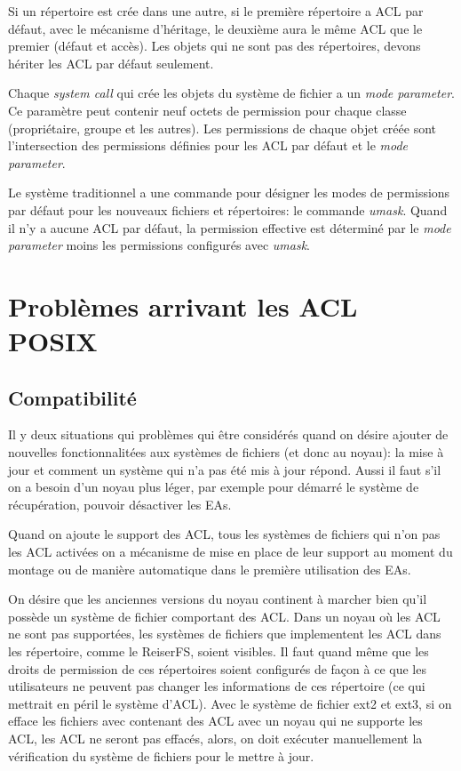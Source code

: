 \documentclass{article}
\begin{document}
Si un répertoire est crée dans une autre, si le première répertoire a ACL par défaut, avec le mécanisme d'héritage, le deuxième aura le même ACL que le premier (défaut  et accès). Les objets qui ne sont pas des répertoires, devons hériter les ACL par défaut seulement.
 
Chaque \emph{system call} qui crée les objets du système de fichier a un \emph{mode parameter}. Ce paramètre peut contenir neuf octets de permission pour chaque classe (propriétaire, groupe et les autres). Les permissions de chaque objet créée sont l'intersection des permissions définies pour les ACL par défaut et le \emph{mode parameter}.
 
Le système traditionnel a une commande pour désigner les modes de permissions par défaut pour les nouveaux fichiers et répertoires: le commande \emph{umask}. Quand il n'y a aucune ACL par défaut, la permission effective est déterminé par le \emph{mode parameter} moins les permissions configurés avec \emph{umask}.

\section{Problèmes arrivant les ACL POSIX}

\subsection{Compatibilité}

Il y deux situations qui problèmes qui être considérés quand on désire ajouter de nouvelles fonctionnalitées aux systèmes de fichiers (et donc au noyau): la mise à jour et comment un système qui n'a pas été mis à jour répond.
Aussi il faut s'il on a besoin d'un noyau plus léger, par exemple pour démarré le système de récupération, pouvoir désactiver les EAs. 

Quand on ajoute le support des ACL, tous les systèmes de fichiers qui n'on pas les ACL activées on a mécanisme de mise en place de leur support au moment du montage ou de manière automatique dans le première utilisation des EAs. 

On désire que les anciennes versions du noyau continent à marcher bien qu'il possède un système de fichier comportant des ACL. Dans un noyau où les ACL ne sont pas supportées, les systèmes de fichiers que implementent les ACL dans les répertoire, comme le ReiserFS, soient visibles. Il faut quand même que les droits de permission de ces répertoires soient configurés de façon à ce que les utilisateurs ne peuvent pas changer les informations de ces répertoire (ce qui mettrait en péril le système d'ACL). Avec le système de fichier ext2 et ext3, si on efface les fichiers avec contenant des ACL avec un noyau qui ne supporte les ACL, les ACL ne seront pas effacés, alors, on doit exécuter manuellement la vérification du système de fichiers pour le mettre à jour. 
 	
\end{document}
